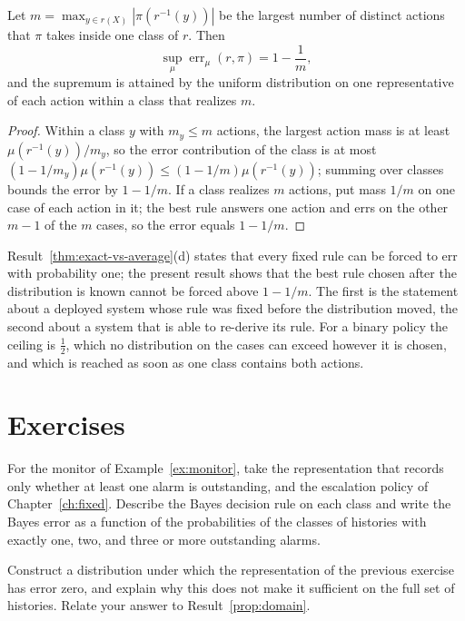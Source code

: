 \begin{newresult}\label{prop:worst-bayes}
Let $m=\max_{y\in r(X)}|\pi(r^{-1}(y))|$ be the largest number of distinct actions that $\pi$ takes inside one class of $r$. Then
\[
\sup_\mu\operatorname{err}_\mu(r,\pi)=1-\frac1m,
\]
and the supremum is attained by the uniform distribution on one representative of each action within a class that realizes $m$.
\end{newresult}
\begin{proof}
Within a class $y$ with $m_y\le m$ actions, the largest action mass is at least $\mu(r^{-1}(y))/m_y$, so the error contribution of the class is at most $(1-1/m_y)\mu(r^{-1}(y))\le(1-1/m)\mu(r^{-1}(y))$; summing over classes bounds the error by $1-1/m$. If a class realizes $m$ actions, put mass $1/m$ on one case of each action in it; the best rule answers one action and errs on the other $m-1$ of the $m$ cases, so the error equals $1-1/m$.
\end{proof}

Result~\ref{thm:exact-vs-average}(d) states that every fixed rule can be forced to err with probability one; the present result shows that the best rule chosen after the distribution is known cannot be forced above $1-1/m$. The first is the statement about a deployed system whose rule was fixed before the distribution moved, the second about a system that is able to re-derive its rule. For a binary policy the ceiling is $\tfrac12$, which no distribution on the cases can exceed however it is chosen, and which is reached as soon as one class contains both actions.

\section*{Exercises}

\begin{exercise}
For the monitor of Example~\ref{ex:monitor}, take the representation that records only whether at least one alarm is outstanding, and the escalation policy of Chapter~\ref{ch:fixed}. Describe the Bayes decision rule on each class and write the Bayes error as a function of the probabilities of the classes of histories with exactly one, two, and three or more outstanding alarms.
\end{exercise}

\begin{exercise}
Construct a distribution under which the representation of the previous exercise has error zero, and explain why this does not make it sufficient on the full set of histories. Relate your answer to Result~\ref{prop:domain}.
\end{exercise}

